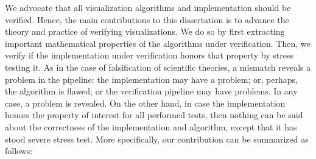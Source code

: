 We advocate that all visualization algorithms and implementation should be verified.
Hence, the main contributions to this dissertation is to advance the theory and practice of verifying visualizations. We do so by first extracting important mathematical properties of the algorithms under verification. Then, we verify if the implementation under verification honors that property by stress testing it. As in the case of falsification of scientific theories, a mismatch reveals a problem in the pipeline: the implementation may have a problem; or, perhaps, the algorithm is flawed; or the verification pipeline may have problems. In any case, a problem is revealed. On the other hand, in case the implementation honors the property of interest for all performed tests, then nothing can be said about the correctness of the implementation and algorithm, except that it has stood severe stress test. More specifically, our contribution can be summarized as follows:
